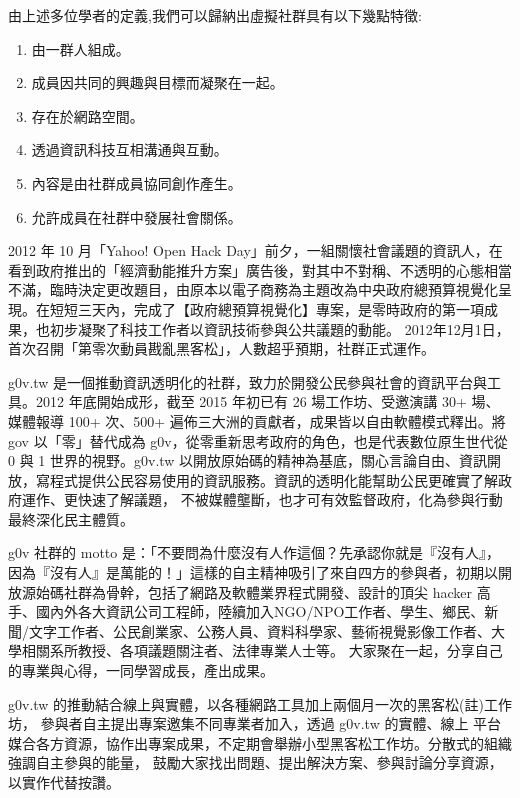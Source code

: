 由上述多位學者的定義,我們可以歸納出虛擬社群具有以下幾點特徵:
\begin{enumerate}
\item 由一群人組成。
\item 成員因共同的興趣與目標而凝聚在一起。
\item 存在於網路空間。
\item 透過資訊科技互相溝通與互動。
\item 內容是由社群成員協同創作產生。
\item 允許成員在社群中發展社會關係。
\end{enumerate}

2012 年 10 月「Yahoo! Open Hack Day」前夕，一組關懷社會議題的資訊人，在看到政府推出的「經濟動能推升方案」廣告後，對其中不對稱、不透明的心態相當不滿，臨時決定更改題目，由原本以電子商務為主題改為中央政府總預算視覺化呈現。在短短三天內，完成了【政府總預算視覺化】專案，是零時政府的第一項成果，也初步凝聚了科技工作者以資訊技術參與公共議題的動能。
2012年12月1日，首次召開「第零次動員戡亂黑客松」，人數超乎預期，社群正式運作。

g0v.tw 是一個推動資訊透明化的社群，致力於開發公民參與社會的資訊平台與工具。2012 年底開始成形，截至 2015 年初已有 26 場工作坊、受邀演講 30+ 場、媒體報導 100+ 次、500+ 遍佈三大洲的貢獻者，成果皆以自由軟體模式釋出。將 gov 以「零」替代成為 g0v，從零重新思考政府的角色，也是代表數位原生世代從 0 與 1 世界的視野。g0v.tw 以開放原始碼的精神為基底，關心言論自由、資訊開放，寫程式提供公民容易使用的資訊服務。資訊的透明化能幫助公民更確實了解政府運作、更快速了解議題，
不被媒體壟斷，也才可有效監督政府，化為參與行動最終深化民主體質。

g0v 社群的 motto 是：「不要問為什麼沒有人作這個？先承認你就是『沒有人』，因為『沒有人』是萬能的！」這樣的自主精神吸引了來自四方的參與者，初期以開放源始碼社群為骨幹，包括了網路及軟體業界程式開發、設計的頂尖 hacker 高手、國內外各大資訊公司工程師，陸續加入NGO/NPO工作者、學生、鄉民、新聞/文字工作者、公民創業家、公務人員、資料科學家、藝術視覺影像工作者、大學相關系所教授、各項議題關注者、法律專業人士等。
大家聚在一起，分享自己的專業與心得，一同學習成長，產出成果。


g0v.tw 的推動結合線上與實體，以各種網路工具加上兩個月一次的黑客松(註)工作坊，
參與者自主提出專案邀集不同專業者加入，透過 g0v.tw 的實體、線上
平台媒合各方資源，協作出專案成果，不定期會舉辦小型黑客松工作坊。分散式的組織強調自主參與的能量，
鼓勵大家找出問題、提出解決方案、參與討論分享資源，以實作代替按讚。

